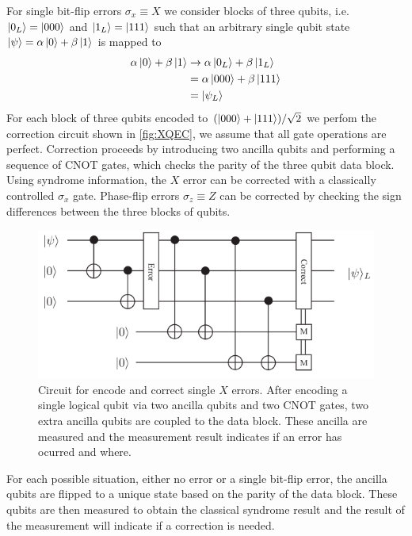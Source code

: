 \documentclass[10pt,a4paper]{book}
\numberwithin{equation}{chapter}
\numberwithin{figure}{chapter}
\numberwithin{table}{chapter}
\begin{document}
For single bit-flip errors $\sigma_x \equiv X$ we consider blocks of three qubits, i.e. $\ket{0_L}=\ket{000}$ and $\ket{1_L}=\ket{111}$ such that an arbitrary single qubit state $\ket{\psi}=\alpha \ket{0}+\beta \ket{1}$ is mapped to
\begin{align*}
\alpha \ket{0}+\beta \ket{1} & \rightarrow \alpha \ket{0_L}+\beta \ket{1_L}\\
&= \alpha \ket{000}+\beta \ket{111}\\
&=\ket{\psi_L}
\end{align*}
For each block of three qubits encoded to $(\ket{000}+\ket{111})/ \sqrt{2}$ we perfom the correction circuit shown in \autoref{fig:XQEC}, we assume that all gate operations are perfect. Correction proceeds by introducing two ancilla qubits and performing a sequence of CNOT gates, which checks the parity of the three qubit data block. Using syndrome information, the $X$ error can be corrected with a classically controlled $\sigma_x$ gate. Phase-flip errors $\sigma_z \equiv Z$ can be corrected by checking the sign differences between the three blocks of qubits.
\begin{figure}[H]
    \begin{center}
        \includegraphics[scale=0.4]{XerrorQEC.png}
    \end{center}
    \caption{\footnotesize Circuit for encode and correct single $X$ errors. After encoding a single logical qubit via two ancilla qubits and two CNOT gates, two extra ancilla qubits are coupled to the data block. These ancilla are measured and the measurement result indicates if an error has ocurred and where.}
    \label{fig:XQEC}
\end{figure}
For each possible situation, either no error or a single bit-flip error, the ancilla qubits are flipped to a unique state based on the parity of the data block. These qubits are then measured to obtain the classical syndrome result and the result of the measurement will indicate if a correction is needed.
\end{document}
